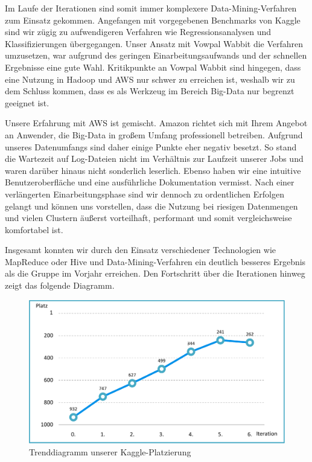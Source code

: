 Im Laufe der Iterationen sind somit immer komplexere Data-Mining-Verfahren zum Einsatz gekommen. Angefangen mit vorgegebenen Benchmarks von Kaggle sind wir zügig zu aufwendigeren Verfahren wie Regressionsanalysen und Klassifizierungen übergegangen. Unser Ansatz mit Vowpal Wabbit die Verfahren umzusetzen, war aufgrund des geringen Einarbeitungsaufwands und der schnellen Ergebnisse eine gute Wahl. Kritikpunkte an Vowpal Wabbit sind hingegen, dass eine Nutzung in Hadoop und AWS nur schwer zu erreichen ist, weshalb wir zu dem Schluss kommen, dass es als Werkzeug im Bereich Big-Data nur begrenzt geeignet ist.

Unsere Erfahrung mit AWS ist gemischt. Amazon richtet sich mit Ihrem Angebot an Anwender, die Big-Data in großem Umfang professionell betreiben. Aufgrund unseres Datenumfangs sind daher einige Punkte eher negativ besetzt. So stand die Wartezeit auf Log-Dateien nicht im Verhältnis zur Laufzeit unserer Jobs und waren darüber hinaus nicht sonderlich leserlich. Ebenso haben wir eine intuitive Benutzeroberfläche und eine ausführliche Dokumentation vermisst. Nach einer verlängerten Einarbeitungsphase sind wir dennoch zu ordentlichen Erfolgen gelangt und können uns vorstellen, dass die Nutzung bei riesigen Datenmengen und vielen Clustern äußerst vorteilhaft, performant und somit vergleichsweise komfortabel ist.

Insgesamt konnten wir durch den Einsatz verschiedener Technologien wie MapReduce oder Hive und Data-Mining-Verfahren ein deutlich besseres Ergebnis als die Gruppe im Vorjahr erreichen. Den Fortschritt über die Iterationen hinweg zeigt das folgende Diagramm.

\begin{figure}[H]
\centering
\includegraphics[width=0.85\linewidth]{Bilder/Trenddiagramm_Platzierungen}
\caption{Trenddiagramm unserer Kaggle-Platzierung}
\label{fig:Trenddiagramm_Platzierungen}
\end{figure}

